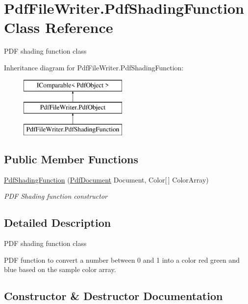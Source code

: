 \hypertarget{class_pdf_file_writer_1_1_pdf_shading_function}{}\section{Pdf\+File\+Writer.\+Pdf\+Shading\+Function Class Reference}
\label{class_pdf_file_writer_1_1_pdf_shading_function}


P\+DF shading function class  


Inheritance diagram for Pdf\+File\+Writer.\+Pdf\+Shading\+Function\+:\begin{figure}[H]
\begin{center}
\leavevmode
\includegraphics[height=3.000000cm]{class_pdf_file_writer_1_1_pdf_shading_function}
\end{center}
\end{figure}
\subsection*{Public Member Functions}
\begin{DoxyCompactItemize}
\item 
\hyperlink{class_pdf_file_writer_1_1_pdf_shading_function_a7930060f9c121fd16c5615b1a69dcfbd}{Pdf\+Shading\+Function} (\hyperlink{class_pdf_file_writer_1_1_pdf_document}{Pdf\+Document} Document, Color\mbox{[}$\,$\mbox{]} Color\+Array)
\begin{DoxyCompactList}\small\item\em P\+DF Shading function constructor \end{DoxyCompactList}\end{DoxyCompactItemize}


\subsection{Detailed Description}
P\+DF shading function class 

P\+DF function to convert a number between 0 and 1 into a color red green and blue based on the sample color array. 

\subsection{Constructor \& Destructor Documentation}
